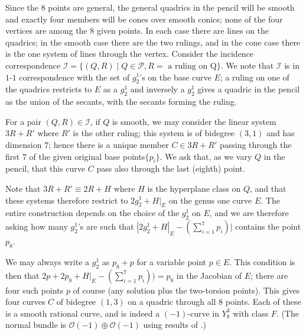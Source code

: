 \documentclass[12pt]{article}
\numberwithin{equation}{section}
\numberwithin{subeq}{equation}
\def\calI{\mathcal{I}}
\def\calO{\mathcal{O}}
\def\calP{\mathcal{P}}
\begin{document}
Since the $8$ points are general,
the general quadrics in the pencil will be smooth
and exactly four members will be cones over smooth conics;
none of the four vertices are among the $8$ given points.
In each case there are lines on the quadrics;
in the smooth case there are the two rulings,
and in the cone case there is the one system of lines through the vertex.
Consider the incidence correspondence
$\calI = \{(Q,R)\;|\; Q \in \calP, R = \text{ a ruling on Q}\}$.
We note that $\calI$ is in $1$-$1$ correspondence with the set of $g^1_2$'s on the base curve $E$;
a ruling on one of the quadrics restricts to $E$ as a $g^1_2$
and inversely a $g^1_2$ gives a quadric in the pencil as the union of the secants,
with the secants forming the ruling.

For a pair $(Q,R)\in \calI$, if $Q$ is smooth,
we may consider the linear system $3R+R'$
where $R'$ is the other ruling;
this system is of bidegree $(3,1)$ and has dimension $7$;
hence there is a unique member $C \in 3R+R'$
passing through the first $7$ of the given original base points$ \{p_i\}$.
We ask that, as we vary $Q$ in the pencil,
that this curve $C$ pass also through the last (eighth) point.

Note that $3R+R' \equiv 2R+H$ where $H$ is the hyperplane class on $Q$,
and that these systems therefore restrict to $2g^1_2+H|_E$ on the genus one curve $E$.
The entire construction depends on the choice of the $g^1_2$ on $E$,
and we are therefore asking how many $g^1_2$'s are such that
$|2g^1_2+H|_E - (\sum_{i=1}^7p_i)|$ contains the point $p_8$.

We may always write a $g^1_2$ as $p_8+p$ for a variable point $p \in E$.
This condition is then that $2p+2p_8+H|_E-(\sum_{i=1}^7p_i)) =p_8$ in the Jacobian of $E$;
there are four such points $p$ of course (any solution plus the two-torsion points).
This gives four curves $C$ of bidegree $(1,3)$ on a quadric through all $8$ points.
Each of these is a smooth rational curve, and is indeed a $(-1)$-curve in $Y^3_8$
with class $F$.
(The normal bundle is $\calO(-1)\oplus\calO(-1)$ using results of \cite{EV}.)
\end{document}
